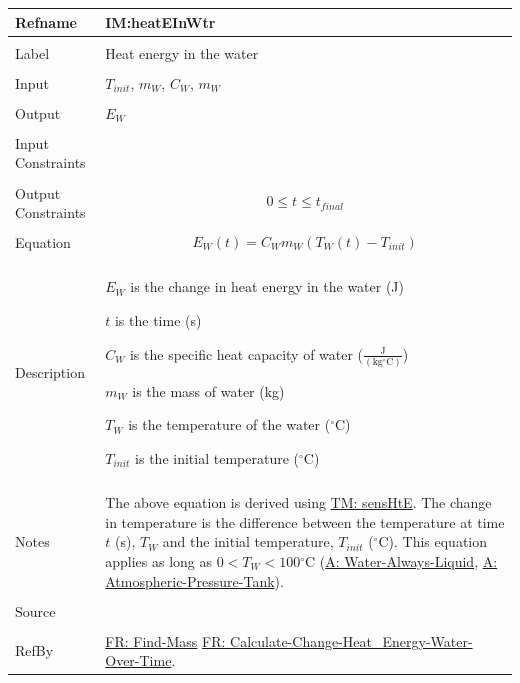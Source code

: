\documentclass[12pt]{article}
\begin{document}
\noindent \begin{minipage}{\textwidth}
\begin{tabular}{p{} p{}}
\toprule \textbf{Refname} & \textbf{IM:heatEInWtr}
\label{IM:heatEInWtr}
\\ \midrule \\
Label & Heat energy in the water
\\ \midrule \\
Input & ${T_{init}}$, ${m_{W}}$, ${C_{W}}$, ${m_{W}}$
\\ \midrule \\
Output & ${E_{W}}$
\\ \midrule \\
Input Constraints & 
\\ \midrule \\
Output Constraints & \begin{displaymath}
                     0\leq{}t\leq{}{t_{final}}
                     \end{displaymath}
\\ \midrule \\
Equation & \begin{displaymath}
           {E_{W}}\left(t\right)={C_{W}} {m_{W}} \left({T_{W}}\left(t\right)-{T_{init}}\right)
           \end{displaymath}
\\ \midrule \\
Description & \begin{symbDescription}
              \item{${E_{W}}$ is the change in heat energy in the water (J)}
              \item{$t$ is the time (s)}
              \item{${C_{W}}$ is the specific heat capacity of water ($\frac{\text{J}}{(\text{kg}{}^{\circ}\text{C})}$)}
              \item{${m_{W}}$ is the mass of water (kg)}
              \item{${T_{W}}$ is the temperature of the water (${}^{\circ}$C)}
              \item{${T_{init}}$ is the initial temperature (${}^{\circ}$C)}
              \end{symbDescription}
\\ \midrule \\
Notes & The above equation is derived using \hyperref[TM:sensHtE]{TM: sensHtE}.
        The change in temperature is the difference between the temperature at time $t$ (s), ${T_{W}}$ and the initial temperature, ${T_{init}}$ (${}^{\circ}$C).
        This equation applies as long as $0<{T_{W}}<100$${}^{\circ}$C (\hyperref[assumpWAL]{A: Water-Always-Liquid}, \hyperref[assumpAPT]{A: Atmospheric-Pressure-Tank}).
\\ \midrule \\
Source & \cite{koothoor2013}
\\ \midrule \\
RefBy & \hyperref[findMass]{FR: Find-Mass} \hyperref[calcChgHeatEnergyWtrOverTime]{FR: Calculate-Change-Heat\_Energy-Water-Over-Time}.
\\ \bottomrule \end{tabular}
\end{minipage}
\end{document}
